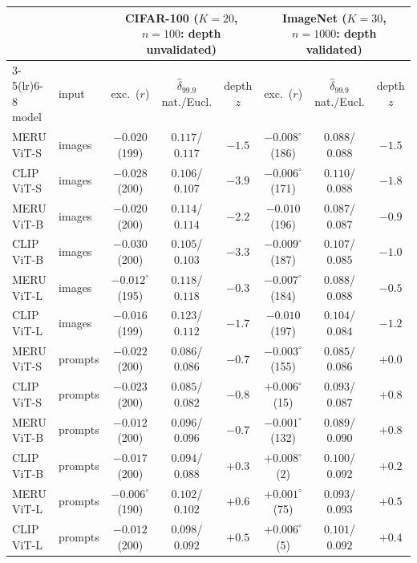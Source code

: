 \begin{table}[H]
\centering
\scriptsize
\setlength{\tabcolsep}{2.6pt}
\begin{tabular}{llccc@{\hspace{8pt}}ccc}
\toprule
 & & \multicolumn{3}{c}{CIFAR-100 ($K{=}20$, $n{=}100$: depth unvalidated)} & \multicolumn{3}{c}{ImageNet ($K{=}30$, $n{=}1000$: depth validated)} \\
\cmidrule(lr){3-5}\cmidrule(lr){6-8}
model & input & exc.\ ($r$) & $\hat\delta_{99.9}$ nat./Eucl. & depth $z$ & exc.\ ($r$) & $\hat\delta_{99.9}$ nat./Eucl. & depth $z$ \\
\midrule
MERU ViT-S & images & $-0.020$ (199) & $0.117$/$0.117$ & $-1.5$ & $-0.008^{\circ}$ (186) & $0.088$/$0.088$ & $-1.5$ \\
CLIP ViT-S & images & $-0.028$ (200) & $0.106$/$0.107$ & $-3.9$ & $-0.006^{\circ}$ (171) & $0.110$/$0.088$ & $-1.8$ \\
MERU ViT-B & images & $-0.020$ (200) & $0.114$/$0.114$ & $-2.2$ & $-0.010$ (196) & $0.087$/$0.087$ & $-0.9$ \\
CLIP ViT-B & images & $-0.030$ (200) & $0.105$/$0.103$ & $-3.3$ & $-0.009^{\circ}$ (187) & $0.107$/$0.085$ & $-1.0$ \\
MERU ViT-L & images & $-0.012^{\circ}$ (195) & $0.118$/$0.118$ & $-0.3$ & $-0.007^{\circ}$ (184) & $0.088$/$0.088$ & $-0.5$ \\
CLIP ViT-L & images & $-0.016$ (199) & $0.123$/$0.112$ & $-1.7$ & $-0.010$ (197) & $0.104$/$0.084$ & $-1.2$ \\
\midrule
MERU ViT-S & prompts & $-0.022$ (200) & $0.086$/$0.086$ & $-0.7$ & $-0.003^{\circ}$ (155) & $0.085$/$0.086$ & $+0.0$ \\
CLIP ViT-S & prompts & $-0.023$ (200) & $0.085$/$0.082$ & $-0.8$ & $+0.006^{\circ}$ (15) & $0.093$/$0.087$ & $+0.8$ \\
MERU ViT-B & prompts & $-0.012$ (200) & $0.096$/$0.096$ & $-0.7$ & $-0.001^{\circ}$ (132) & $0.089$/$0.090$ & $+0.8$ \\
CLIP ViT-B & prompts & $-0.017$ (200) & $0.094$/$0.088$ & $+0.3$ & $+0.008^{\circ}$ (2) & $0.100$/$0.092$ & $+0.2$ \\
MERU ViT-L & prompts & $-0.006^{\circ}$ (190) & $0.102$/$0.102$ & $+0.6$ & $+0.001^{\circ}$ (75) & $0.093$/$0.093$ & $+0.5$ \\
CLIP ViT-L & prompts & $-0.012$ (200) & $0.098$/$0.092$ & $+0.5$ & $+0.006^{\circ}$ (5) & $0.101$/$0.092$ & $+0.4$ \\
\bottomrule
\end{tabular}

\end{table}
